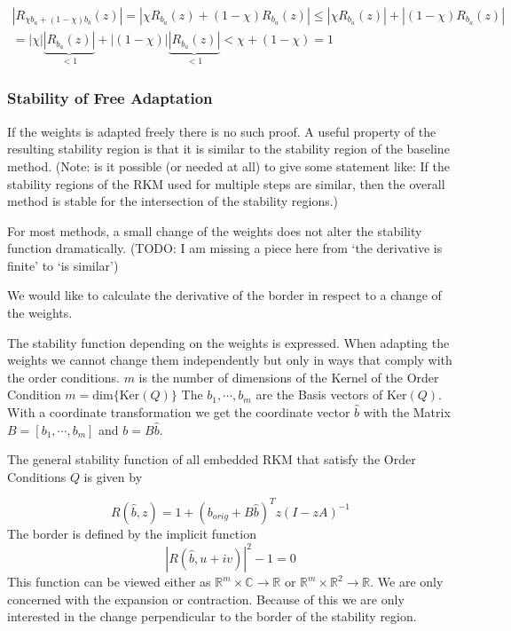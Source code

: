 \documentclass[a4paper]{article}
\numberwithin{equation}{section}
\theoremstyle{plain}
\theoremstyle{definition}
\numberwithin{theorem}{section}
\newcommand{\R}{\mathbb{R}}
\newcommand{\CN}{\mathbb{C}}
\newcommand{\1}{\mathbbm{1}}
\begin{document}
\begin{multline}
|R_{\chi b_a +(1-\chi) b_b}(z)| = |\chi R_{b_a}(z) + (1-\chi) R_{b_a}(z)| \leq |\chi R_{b_a}(z)| + |(1-\chi) R_{b_a}(z)|\\
 =| \chi| \underbrace{|R_{b_a}(z)|}_{<1} + |(1-\chi)| \underbrace{|R_{b_a}(z)|}_{<1} < \chi + (1-\chi)= 1
\end{multline}



\subsubsection{Stability of  Free Adaptation}
If the weights is adapted freely there is no such proof.
A useful property of the resulting stability region is that it is similar to the stability region of the baseline method. 
(Note: is it possible (or needed at all) to give some statement like: If the stability regions of the RKM used for multiple steps are similar, then the overall method is stable for the intersection of the stability regions.)

For most methods, a small change of the weights does not alter the stability function dramatically.
(TODO: I am missing a piece here from ‘the derivative is finite’ to ‘is similar’)

We would like to calculate the derivative of the border in respect to a change of the weights. 

The stability function depending on the weights is expressed. 
When adapting the weights we cannot change them independently but only in ways that comply with the order conditions.
$m$ is the number of dimensions of the Kernel of the Order Condition $m = \mathrm{dim}\{\mathrm{Ker} (Q) \}$
The $b_1,\cdots,b_m$  are the Basis vectors of $\mathrm{Ker} (Q)$. With a coordinate transformation we get the coordinate vector $\hat{b}$ with the Matrix $B = [b_1,\cdots,b_m]$ and $b = B \hat{b}$.

The general stability function of all embedded RKM that satisfy the Order Conditions $Q$ is given by 

\begin{equation}\label{eq:gen_stabilityf}
R(\hat{b},z) = 1 +  (b_{orig} +B \hat{b})^T z(I - zA)^{-1}
\end{equation}
The border is defined by the implicit function 
\begin{equation}\label{eq:border}
|R(\hat{b},u+iv)|^2 -1 = 0
\end{equation}
This function can be viewed either as $\R^m \times  \CN \rightarrow \R$ or $\R^m \times  \R^2 \rightarrow \R$.
We are only concerned with the expansion or contraction. Because of this we are only interested in the change perpendicular to the border of the stability region. 
\end{document}
